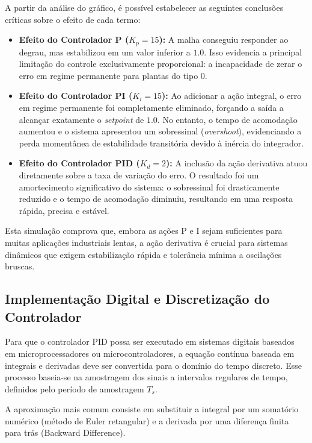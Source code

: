 \documentclass[12pt]{article}
\begin{document}
A partir da análise do gráfico, é possível estabelecer as seguintes conclusões críticas sobre o efeito de cada termo:

\begin{itemize}
    \item \textbf{Efeito do Controlador P ($K_p = 15$):} A malha conseguiu responder ao degrau, mas estabilizou em um valor inferior a $1.0$. Isso evidencia a principal limitação do controle exclusivamente proporcional: a incapacidade de zerar o erro em regime permanente para plantas do tipo 0.
    \item \textbf{Efeito do Controlador PI ($K_i = 15$):} Ao adicionar a ação integral, o erro em regime permanente foi completamente eliminado, forçando a saída a alcançar exatamente o \textit{setpoint} de $1.0$. No entanto, o tempo de acomodação aumentou e o sistema apresentou um sobressinal (\textit{overshoot}), evidenciando a perda momentânea de estabilidade transitória devido à inércia do integrador.
    \item \textbf{Efeito do Controlador PID ($K_d = 2$):} A inclusão da ação derivativa atuou diretamente sobre a taxa de variação do erro. O resultado foi um amortecimento significativo do sistema: o sobressinal foi drasticamente reduzido e o tempo de acomodação diminuiu, resultando em uma resposta rápida, precisa e estável.
\end{itemize}

Esta simulação comprova que, embora as ações P e I sejam suficientes para muitas aplicações industriais lentas, a ação derivativa é crucial para sistemas dinâmicos que exigem estabilização rápida e tolerância mínima a oscilações bruscas.

\subsection{Implementação Digital e Discretização do Controlador}

Para que o controlador PID possa ser executado em sistemas digitais baseados em microprocessadores ou microcontroladores, a equação contínua baseada em integrais e derivadas deve ser convertida para o domínio do tempo discreto. Esse processo baseia-se na amostragem dos sinais a intervalos regulares de tempo, definidos pelo período de amostragem $T_s$.

A aproximação mais comum consiste em substituir a integral por um somatório numérico (método de Euler retangular) e a derivada por uma diferença finita para trás (Backward Difference).
\end{document}
